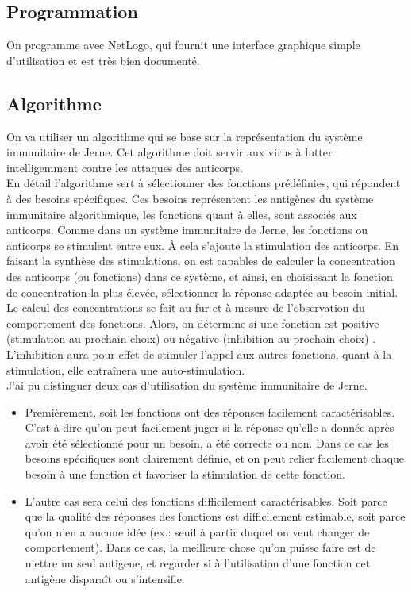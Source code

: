 \documentclass[11pt]{article} %
\begin{document}
\subsection{Programmation}

On programme avec NetLogo, qui fournit une interface graphique simple d'utilisation et est très bien documenté.

\subsection{Algorithme}

On va utiliser un algorithme qui se base sur la représentation du système immunitaire de Jerne. Cet algorithme doit servir aux virus à lutter intelligemment contre les attaques des anticorps.
\\
En détail l'algorithme sert à sélectionner des fonctions prédéfinies, qui répondent à des besoins spécifiques. Ces besoins représentent les antigènes du système immunitaire algorithmique, les fonctions quant à elles, sont associés aux anticorps. Comme dans un système immunitaire de Jerne, les fonctions ou anticorps se stimulent entre eux. \`A cela s'ajoute la stimulation des anticorps. En faisant la synthèse des stimulations, on est capables de calculer la concentration des anticorps (ou fonctions) dans ce système, et ainsi, en choisissant la fonction de concentration la plus élevée, sélectionner la réponse adaptée au besoin initial.
\\
Le calcul des concentrations se fait au fur et à mesure de l'observation du comportement des fonctions. Alors, on détermine si une fonction est positive (stimulation au prochain choix) ou négative (inhibition au prochain choix) . L'inhibition aura pour effet de stimuler l'appel aux autres fonctions, quant à  la stimulation, elle entraînera une auto-stimulation.
\\
J'ai pu distinguer deux cas d'utilisation du système immunitaire de Jerne.
\begin{itemize}
	\item Premièrement, soit les fonctions ont des réponses facilement caractérisables. C'est-à-dire qu'on peut facilement juger si la réponse qu'elle a donnée après avoir été sélectionné pour un besoin, a été correcte ou non. Dans ce cas les besoins spécifiques sont clairement définie, et on peut relier facilement chaque besoin à une fonction et favoriser la stimulation de cette fonction.
	\item L'autre cas sera celui des fonctions difficilement caractérisables. Soit parce que la qualité des réponses des fonctions est difficilement estimable, soit parce qu'on n'en a aucune idée (ex.: seuil à partir duquel on veut changer de comportement). Dans ce cas, la meilleure chose qu'on puisse faire est de mettre un seul antigene, et regarder si à l'utilisation d'une fonction cet antigène disparaît ou s'intensifie.
\end{itemize}
\end{document}
